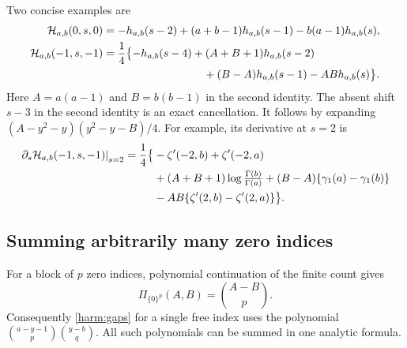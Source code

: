 \documentclass[11pt,a4paper]{article}
\numberwithin{equation}{section}
\theoremstyle{definition}
\theoremstyle{remark}
\begin{document}
Two concise examples are
\begin{align}
 \mathcal H_{a,b}(0,s,0)
   &=-h_{a,b}(s-2)+(a+b-1)h_{a,b}(s-1)
                                  -b(a-1)h_{a,b}(s),
 \label{harm:examplezero}\\
 \mathcal H_{a,b}(-1,s,-1)
   &=\frac14\bigl\{-h_{a,b}(s-4)
       +(A+B+1)h_{a,b}(s-2)\notag\\
   &\hspace{32mm}+(B-A)h_{a,b}(s-1)-ABh_{a,b}(s)\bigr\}.
 \label{harm:exampleone}
\end{align}
Here $A=a(a-1)$ and $B=b(b-1)$ in the second identity.
The absent shift $s-3$ in the second identity is an exact cancellation.
It follows by expanding
$(A-y^2-y)(y^2-y-B)/4$. For example, its derivative at $s=2$ is
\begin{align}
 \left.\partial_s\mathcal H_{a,b}(-1,s,-1)\right|_{s=2}
  =\frac14\bigl\{&-\zeta'(-2,b)+\zeta'(-2,a)\notag\\
       &+(A+B+1)\log\tfrac{\Gamma(b)}{\Gamma(a)}
        +(B-A)\{\gamma_1(a)-\gamma_1(b)\}\notag\\
       &-AB\{\zeta'(2,b)-\zeta'(2,a)\}\bigr\}.
 \label{harm:examplejet}
\end{align}

\subsection{Summing arbitrarily many zero indices}

For a block of $p$ zero indices, polynomial continuation of the finite
count gives
\begin{equation}
                    \Pi_{\{0\}^p}(A,B)=\binom{A-B}{p}.
 \label{harm:zeroblock}
\end{equation}
Consequently \eqref{harm:gaps} for a single free index uses the polynomial
$\binom{a-y-1}{p}\binom{y-b}{q}$. All such polynomials can be summed
in one analytic formula.
\end{document}
